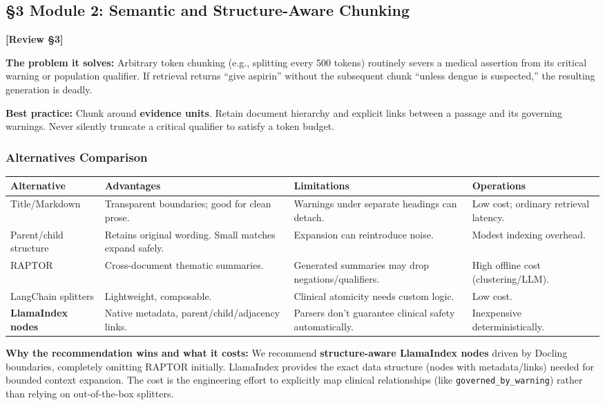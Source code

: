 \documentclass[11pt,a4paper]{article}
\newcommand{\origintag}[2]{\textcolor{#1}{\small\textbf{[#2]}}}
\begin{document}
\subsection{\S3 Module 2: Semantic and Structure-Aware Chunking}
\origintag{amber}{Review \S3}

\textbf{The problem it solves:} Arbitrary token chunking (e.g., splitting every 500 tokens) routinely severs a medical assertion from its critical warning or population qualifier. If retrieval returns ``give aspirin'' without the subsequent chunk ``unless dengue is suspected,'' the resulting generation is deadly.

\textbf{Best practice:} Chunk around \textbf{evidence units}. Retain document hierarchy and explicit links between a passage and its governing warnings. Never silently truncate a critical qualifier to satisfy a token budget. 

\subsubsection{Alternatives Comparison}
\begin{table}[ht]
\centering
\begin{tabularx}{\textwidth}{lXXX}
\toprule
\textbf{Alternative} & \textbf{Advantages} & \textbf{Limitations} & \textbf{Operations} \\
\midrule
Title/Markdown & Transparent boundaries; good for clean prose. & Warnings under separate headings can detach. & Low cost; ordinary retrieval latency. \\
Parent/child structure & Retains original wording. Small matches expand safely. & Expansion can reintroduce noise. & Modest indexing overhead. \\
RAPTOR & Cross-document thematic summaries. & Generated summaries may drop negations/qualifiers. & High offline cost (clustering/LLM). \\
LangChain splitters & Lightweight, composable. & Clinical atomicity needs custom logic. & Low cost. \\
\textbf{LlamaIndex nodes} & Native metadata, parent/child/adjacency links. & Parsers don't guarantee clinical safety automatically. & Inexpensive deterministically. \\
\bottomrule
\end{tabularx}
\end{table}

\textbf{Why the recommendation wins and what it costs:} We recommend \textbf{structure-aware LlamaIndex nodes} driven by Docling boundaries, completely omitting RAPTOR initially. LlamaIndex provides the exact data structure (nodes with metadata/links) needed for bounded context expansion. The cost is the engineering effort to explicitly map clinical relationships (like \texttt{governed\_by\_warning}) rather than relying on out-of-the-box splitters.
\end{document}
